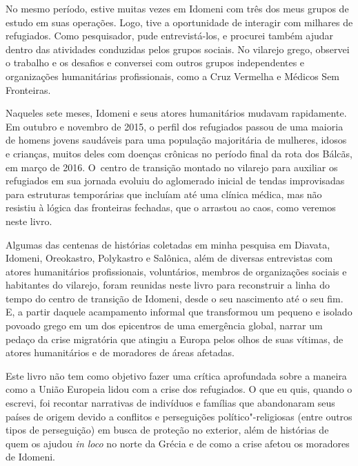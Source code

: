 No mesmo período, estive muitas vezes em Idomeni com três dos meus grupos de estudo em suas operações. Logo, tive a oportunidade de interagir com milhares de refugiados. Como pesquisador, pude entrevistá-los, e  procurei também ajudar dentro das atividades conduzidas pelos grupos sociais. No vilarejo
grego, observei o trabalho e os desafios e conversei com outros
grupos independentes e organizações humanitárias profissionais, como a
Cruz Vermelha e Médicos Sem Fronteiras.

Naqueles sete meses, Idomeni e seus atores humanitários mudavam
rapidamente.  Em outubro e novembro de 2015, o perfil dos refugiados passou de uma maioria
de homens jovens saudáveis para uma população majoritária de mulheres, idosos e crianças, muitos deles com
doenças crônicas no período final da rota dos Bálcãs, em março de 2016.
O~centro de transição montado no vilarejo para auxiliar os refugiados em
sua jornada evoluiu do aglomerado inicial de tendas improvisadas para
estruturas temporárias que incluíam até uma clínica médica, mas não
resistiu à lógica das fronteiras fechadas, que o arrastou ao caos, como veremos neste livro. 
% 
% 
% 
% 
%
%

Algumas das centenas de histórias coletadas em minha pesquisa em
Diavata, Idomeni, Oreokastro, Polykastro e Salônica, além de diversas
entrevistas com atores humanitários profissionais, voluntários, membros
de organizações sociais e habitantes do vilarejo, foram reunidas neste
livro para reconstruir a linha do tempo do centro de transição de
Idomeni, desde o seu nascimento até o seu fim. E, a partir daquele
acampamento informal que transformou um pequeno e isolado povoado grego
em um dos epicentros de uma emergência global, narrar um pedaço da crise
migratória que atingiu a Europa pelos olhos de suas vítimas, de atores
humanitários e de moradores de áreas afetadas.

\EP[2]
Este livro não tem como objetivo fazer uma crítica aprofundada sobre a
maneira como a União Europeia lidou com a crise dos refugiados. O que eu quis, quando o escrevi, foi 
recontar narrativas de indivíduos e famílias que abandonaram seus países
de origem devido a conflitos e perseguições político"-religiosas (entre
outros tipos de perseguição) em busca de proteção no exterior, além de
histórias de quem os ajudou \emph{in loco} no norte da Grécia e de como
a crise afetou os moradores de Idomeni.


